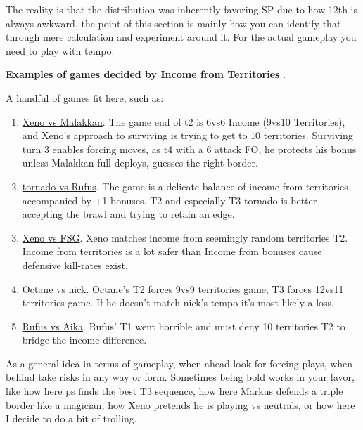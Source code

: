 The reality is that the distribution was inherently favoring SP due to how 12th is always awkward, the point of this section is mainly how you can identify that through mere calculation and experiment around it. For the actual gameplay you need to play with tempo.

\textbf{Examples of games decided by Income from Territories }.

A handful of games fit here, such as:
\begin{enumerate}
    \item \href{https://www.warzone.com/MultiPlayer?GameID=32875754}{Xeno vs Malakkan}. The game end of t2 is 6vs6 Income (9vs10 Territories), and Xeno's approach to surviving is trying to get to 10 territories. Surviving turn 3 enables forcing moves, as t4 with a 6 attack FO, he protects his bonus unless Malakkan full deploys, guesses the right border.
    \item \href{https://www.warzone.com/MultiPlayer?GameID=32875753}{tornado vs Rufus}. The game is a delicate balance of income from territories accompanied by +1 bonuses. T2 and especially T3 tornado is better accepting the brawl and trying to retain an edge.
    \item \href{https://www.warzone.com/MultiPlayer?GameID=32726827}{Xeno vs FSG}. Xeno matches income from seemingly random territories T2. Income from territories is a lot safer than Income from bonuses cause defensive kill-rates exist.
    \item \href{https://www.warzone.com/MultiPlayer?GameID=33055938}{Octane vs nick}. Octane's T2 forces 9vs9 territories game, T3 forces 12vs11 territories game. If he doesn't match nick's tempo it's most likely a loss.
    \item \href{https://www.warzone.com/MultiPlayer?GameID=37222704}{Rufus vs Aika}. Rufus' T1 went horrible and must deny 10 territories T2 to bridge the income difference.
\end{enumerate}

As a general idea in terms of gameplay, when ahead look for forcing plays, when behind take risks in any way or form. Sometimes being bold works in your favor, like how \href{https://www.warzone.com/MultiPlayer?GameID=38662026}{here} ps finds the best T3 sequence, how \href{https://www.warzone.com/MultiPlayer?GameID=38696092}{here} Markus defends a triple border like a magician, how \href{https://www.warzone.com/MultiPlayer?GameID=37731836}{Xeno} pretends he is playing vs neutrals, or how \href{https://www.warzone.com/MultiPlayer?GameID=41449221}{here} I decide to do a bit of trolling.


